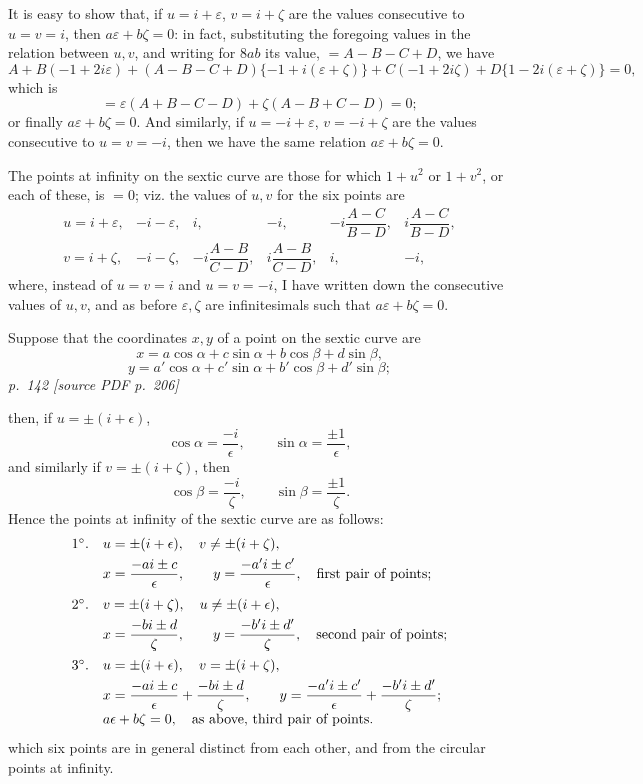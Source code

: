 \documentclass[11pt,a4paper]{article}
\newcommand{\sourcepage}[2]{%
  \bigskip
  \noindent\textit{p.~#1 [source PDF p.~#2]}%
  \par\smallskip
}
\begin{document}
It is easy to show that, if $u=i+\varepsilon$, $v=i+\zeta$ are the values
consecutive to $u=v=i$, then $a\varepsilon+b\zeta=0$: in fact, substituting the
foregoing values in the relation between $u,v$, and writing for $8ab$ its value,
$=A-B-C+D$, we have
\[
A+B(-1+2i\varepsilon)+(A-B-C+D)\{-1+i(\varepsilon+\zeta)\}
+C(-1+2i\zeta)+D\{1-2i(\varepsilon+\zeta)\}=0,
\]
which is
\[
=\varepsilon(A+B-C-D)+\zeta(A-B+C-D)=0;
\]
or finally $a\varepsilon+b\zeta=0$. And similarly, if
$u=-i+\varepsilon$, $v=-i+\zeta$ are the values consecutive to $u=v=-i$, then we
have the same relation $a\varepsilon+b\zeta=0$.

The points at infinity on the sextic curve are those for which $1+u^2$ or
$1+v^2$, or each of these, is $=0$; viz. the values of $u,v$ for the six points are
\[
\begin{array}{cccccc}
u=i+\varepsilon,&-i-\varepsilon,&i,&-i,&
-i\dfrac{A-C}{B-D},& i\dfrac{A-C}{B-D},\\[2mm]
v=i+\zeta,&-i-\zeta,&-i\dfrac{A-B}{C-D},&
i\dfrac{A-B}{C-D},&i,&-i,
\end{array}
\]
where, instead of $u=v=i$ and $u=v=-i$, I have written down the consecutive values
of $u,v$, and as before $\varepsilon,\zeta$ are infinitesimals such that
$a\varepsilon+b\zeta=0$.

Suppose that the coordinates $x,y$ of a point on the sextic curve are
\[
x=a\cos\alpha+c\sin\alpha+b\cos\beta+d\sin\beta,
\]
\[
y=a'\cos\alpha+c'\sin\alpha+b'\cos\beta+d'\sin\beta;
\]
\sourcepage{142}{206}

then, if \(u=\pm(i+\epsilon)\),
\[
\cos\alpha=\frac{-i}{\epsilon},\qquad \sin\alpha=\frac{\pm 1}{\epsilon},
\]
and similarly if \(v=\pm(i+\zeta)\), then
\[
\cos\beta=\frac{-i}{\zeta},\qquad \sin\beta=\frac{\pm 1}{\zeta}.
\]
Hence the points at infinity of the sextic curve are as follows:
\[
\begin{array}{ll}
1^\circ.& u=\pm(i+\epsilon),\quad v\ne\pm(i+\zeta),\\[0.35em]
&\displaystyle x=\frac{-ai\pm c}{\epsilon},\qquad
  y=\frac{-a'i\pm c'}{\epsilon},\quad\hbox{first pair of points;}\\[1.0em]
2^\circ.& v=\pm(i+\zeta),\quad u\ne\pm(i+\epsilon),\\[0.35em]
&\displaystyle x=\frac{-bi\pm d}{\zeta},\qquad
  y=\frac{-b'i\pm d'}{\zeta},\quad\hbox{second pair of points;}\\[1.0em]
3^\circ.& u=\pm(i+\epsilon),\quad v=\pm(i+\zeta),\\[0.35em]
&\displaystyle x=\frac{-ai\pm c}{\epsilon}+\frac{-bi\pm d}{\zeta},\qquad
  y=\frac{-a'i\pm c'}{\epsilon}+\frac{-b'i\pm d'}{\zeta};\\[0.5em]
& a\epsilon+b\zeta=0,\quad\hbox{as above, third pair of points.}
\end{array}
\]
which six points are in general distinct from each other, and from the circular points
at infinity.
\end{document}
